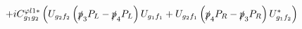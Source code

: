%
\begin{dmath*}
%
  +  iC^{ \varphi  l1*}_{g_1 g_2} \left(U_{g_2 f_2} \left(\slashed{p}_{3} P_L - \slashed{p}_{4} P_L\right) U_{g_1 f_1} + U_{g_2 f_1} \left(\slashed{p}_{4} P_R - \slashed{p}_{3} P_R\right) U_{g_1 f_2}^*\right)
%
\end{dmath*}
%
